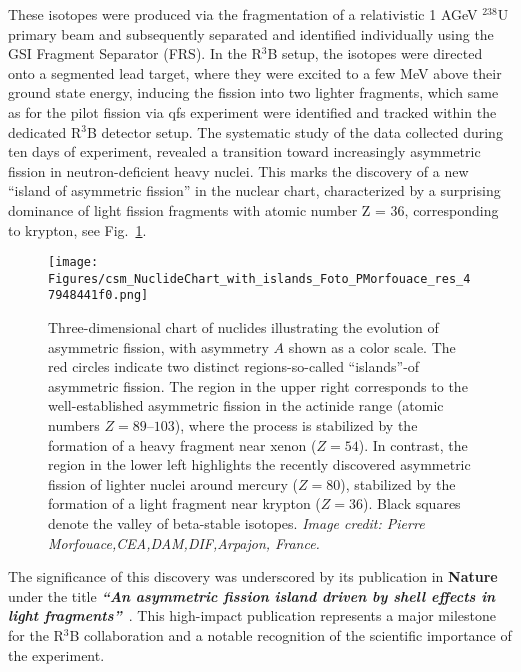 These isotopes were produced via the fragmentation of a relativistic  1 AGeV  $^{238}$U primary beam  and subsequently separated and identified individually using the GSI Fragment Separator (FRS). In the R$^3$B setup, the isotopes were directed onto a segmented lead target, where they were excited to a few MeV above their ground state energy, inducing the fission into two lighter fragments, which same as for the pilot fission via qfs experiment were identified and tracked within the dedicated R$^3$B detector setup.\newline
The systematic study of the data collected during ten days of experiment, revealed a transition toward increasingly asymmetric fission in neutron-deficient heavy nuclei. This marks the discovery of a new ``island of asymmetric fission'' in the nuclear chart, characterized by a surprising dominance of light fission fragments with atomic number Z = 36, corresponding to krypton, see Fig.~\ref{fig:asymmetric_fission_islands}.\newline
\begin{figure}[ht]
    \centering
    \texttt{[image: Figures/csm\_NuclideChart\_with\_islands\_Foto\_PMorfouace\_res\_47948441f0.png]}
    \caption[Asymmetric fission regions in the chart of nuclides]{Three-dimensional chart of nuclides illustrating the evolution of asymmetric fission, with asymmetry \( A \) shown as a color scale. The red circles indicate two distinct regions-so-called ``islands''-of asymmetric fission. The region in the upper right corresponds to the well-established asymmetric fission in the actinide range (atomic numbers \( Z = 89\text{--}103 \)), where the process is stabilized by the formation of a heavy fragment near xenon (\( Z = 54 \)). In contrast, the region in the lower left highlights the recently discovered asymmetric fission of lighter nuclei around mercury (\( Z = 80 \)), stabilized by the formation of a light fragment near krypton (\( Z = 36 \)). Black squares denote the valley of beta-stable isotopes. \textit{Image credit: Pierre Morfouace,CEA,DAM,DIF,Arpajon, France.}}
    \label{fig:asymmetric_fission_islands}
\end{figure}
The significance of this discovery was underscored by its publication in \textbf{Nature} under the title \textbf{\textit{``An asymmetric fission island driven by shell effects in light fragments''}}~\cite{morfouace2025asymmetric}. This high-impact publication represents a major milestone for the R$^3$B collaboration and a notable recognition of the scientific importance of the experiment.\newline
